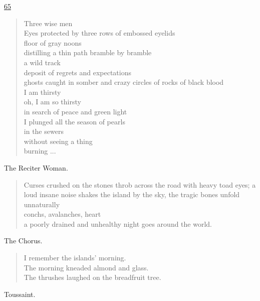 \documentclass[letterpaper,article,12pt,oneside,notitlepage]{memoir}
\begin{document}
\clearpage

\href{http://cesaire.elotroalex.com/chiens/chiens/p065.html}{65}

\begin{verse}
Three wise men \\
Eyes protected by three rows of embossed eyelids \\
floor of gray noons \\
distilling a thin path bramble by bramble \\
a wild track \\
deposit of regrets and expectations \\
ghosts caught in somber and crazy circles of rocks of black blood \\
I am thirsty \\
oh, I am so thirsty \\
in search of peace and green light \\
I plunged all the season of pearls \\
in the sewers \\
without seeing a thing \\
burning ... \\
\end{verse}

\begin{center}The Reciter Woman.\end{center}

\begin{verse}
\indent Curses crushed on the stones throb across the road with heavy toad eyes; a loud insane noise shakes the island by the sky, the tragic bones unfold unnaturally \\
conchs, avalanches, heart \\
a poorly drained and unhealthy night goes around the world. \\
\end{verse}

\begin{center}The Chorus.\end{center}

\begin{verse}
\hspace{1cm} I remember the islands' morning. \\
The morning kneaded almond and glass. \\
The thrushes laughed on the breadfruit tree. \\
\end{verse}

\begin{center}Toussaint.\end{center}
\end{document}
